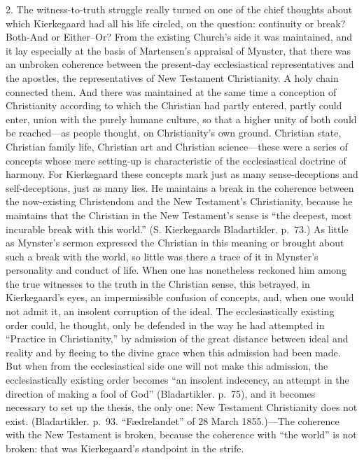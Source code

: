 \documentclass[12pt,a4paper]{book}
\newcommand{\opage}[1]{\marginnote{\footnotesize\textit{[#1]}}}
\begin{document}
2. The witness-to-truth struggle really turned on one of the chief
thoughts about which Kierkegaard had all his life circled, on the
question: continuity or break? Both-And or Either--Or? From the existing
Church's
\opage{145}side it was maintained, and it lay especially at the basis of
Martensen's appraisal of Mynster, that there was an unbroken coherence
between the present-day ecclesiastical representatives and the apostles,
the representatives of New Testament Christianity. A holy chain
connected them. And there was maintained at the same time a conception
of Christianity according to which the Christian had partly entered,
partly could enter, union with the purely humane culture, so that a
higher unity of both could be reached---as people thought, on
Christianity's own ground. Christian state, Christian family life,
Christian art and Christian science---these were a series of concepts
whose mere setting-up is characteristic of the ecclesiastical doctrine of
harmony. For Kierkegaard these concepts mark just as many
sense-deceptions and self-deceptions, just as many lies. He maintains a
break in the coherence between the now-existing Christendom and the New
Testament's Christianity, because he maintains that the Christian in the
New Testament's sense is ``the deepest, most incurable break with this
world.'' (S. Kierkegaards Bladartikler. p.~73.) As little as Mynster's
sermon expressed the Christian in this meaning or brought about such a
break with the world, so little was there a trace of it in Mynster's
personality and conduct of life. When one has nonetheless reckoned him
among the true witnesses to the truth in the Christian sense, this
betrayed, in Kierkegaard's eyes, an impermissible confusion of concepts,
and, when one would not admit it, an insolent corruption of the ideal.
The ecclesiastically existing order could, he thought, only be defended
in the way he had attempted in ``Practice in Christianity,'' by admission
of the great distance between ideal and reality and by fleeing to the
divine grace when this admission had been made. But when from the
ecclesiastical side one will not make this admission, the
\opage{146}ecclesiastically existing order becomes ``an insolent indecency,
an attempt in the direction of making a fool of God'' (Bladartikler.
p.~75), and it becomes necessary to set up the thesis, the only one: New
Testament Christianity does not exist. (Bladartikler. p.~93.
``Fædrelandet'' of 28 March 1855.)---The coherence with the New Testament
is broken, because the coherence with ``the world'' is not broken: that
was Kierkegaard's standpoint in the strife.
\end{document}
